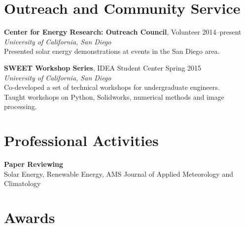 \documentclass[]{res}
\begin{document}
\begin{resume}
\section{Outreach and Community Service}
\vspace{0.1in}
%

\textbf{Center for Energy Research: Outreach Council}, Volunteer \hfill 2014--present \\
\textit{University of California, San Diego} \\
Presented solar energy demonstrations at events in the San Diego area.

\textbf{SWEET Workshop Series}, IDEA Student Center \hfill Spring 2015 \\
\textit{University of California, San Diego} \\
Co-developed a set of technical workshops for undergraduate engineers. \\
Taught workshops on Python, Solidworks, numerical methods and image processing.


\section{Professional Activities}
\vspace{0.1in}

\textbf{Paper Reviewing} \\
Solar Energy, Renewable Energy, AMS Journal of Applied Meteorology and
Climatology


%
\section{Awards}
\vspace{0.1in}


\end{resume}
\end{document}
